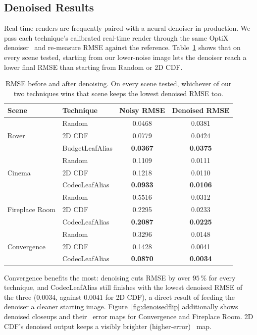 \documentclass[acmtog,review]{acmart}
\begin{document}
\subsection{Denoised Results}
\label{sec:denoise}
Real-time renders are frequently paired with a neural denoiser in production. We pass each
technique's calibrated real-time render through the same OptiX denoiser~\cite{nvidia2021optixdenoiser} and re-measure
RMSE against the reference. Table~\ref{tab:denoise} shows that on every scene tested,
starting from our lower-noise image lets the denoiser reach a lower final RMSE than starting
from Random or 2D CDF.

\begin{table}[htbp!]
\centering
\small
\caption{RMSE before and after denoising. On every scene tested, whichever of our two techniques wins that scene keeps the lowest denoised RMSE too. }
\label{tab:denoise}
\begin{tabular}{ll cc}
\toprule
Scene & Technique & Noisy RMSE & Denoised RMSE \\
\midrule
\multirow{3}{*}{Rover}
 & Random & 0.0468 & 0.0381 \\
 & 2D CDF & 0.0779 & 0.0424 \\
 & {BudgetLeafAlias} & \textbf{0.0367} & \textbf{0.0375} \\
\midrule
\multirow{3}{*}{Cinema}
 & Random & 0.1109 & 0.0111 \\
 & 2D CDF & 0.1218 & 0.0110 \\
 & {CodecLeafAlias} & \textbf{0.0933} & \textbf{0.0106} \\
\midrule
\multirow{3}{*}{Fireplace Room}
 & Random & 0.5516 & 0.0312 \\
 & 2D CDF & 0.2295 & 0.0233 \\
 & {CodecLeafAlias} & \textbf{0.2087} & \textbf{0.0225} \\
\midrule
\multirow{3}{*}{Convergence}
 & Random & 0.3296 & 0.0148 \\
 & 2D CDF & 0.1428 & 0.0041 \\
 & {CodecLeafAlias} & \textbf{0.0870} & \textbf{0.0034} \\
\bottomrule
\end{tabular}
\end{table}


Convergence benefits the most: denoising cuts RMSE by over $95\,\%$ for every technique, and
CodecLeafAlias still finishes with the lowest denoised RMSE of the three ($0.0034$,
against $0.0041$ for 2D CDF), a direct result of feeding the denoiser a cleaner starting
image. Figure~\ref{fig:denoisedflip} additionally shows
denoised closeups and their \FLIP\  error maps for Convergence and Fireplace Room. 2D CDF's denoised output keeps a visibly brighter (higher-error) \FLIP\ map.
\end{document}
